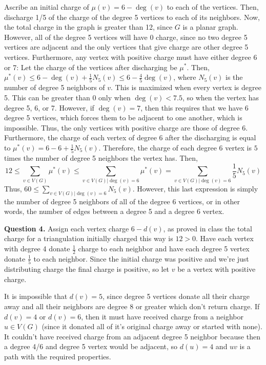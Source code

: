 \documentclass[letterpaper, reqno,11pt]{article}
\begin{document}
Ascribe an initial charge of $\mu(v) = 6 - \deg(v)$ to each of the vertices. Then, discharge 1/5 of the charge of the degree 5 vertices to each of its neighbors. Now, the total charge in the graph is greater than 12, since $G$ is a planar graph. However, all of the degree 5 vertices will have 0 charge, since no two degree 5 vertices are adjacent and the only vertices that give charge are other degree 5 vertices. Furthermore, any vertex with positive charge must have either degree 6 or 7: Let the charge of the vertices after discharging be $\mu^{*}$. Then, $\mu^{*}(v) \leq  6 - \deg(v) + \frac{1}{5}N_5(v) \leq 6 - \frac{4}{5}\deg(v)$, where $N_5(v)$ is the number of degree 5 neighbors of $v$. 
This is maximized when every vertex is degree 5. This can be greater than 0 only when $\deg(v) < 7.5$, so when the vertex has degree 5, 6, or 7. However, if $\deg(v) = 7$, then this requires that we have 6 degree 5 vertices, which forces them to be adjacent to one another, which is impossible. Thus, the only vertices with positive charge are those of degree 6. Furthermore, the charge of each vertex of degree 6 after the discharging is equal to $\mu^{*}(v) = 6 - 6 + \frac{1}{5}N_5(v)$. Therefore, the charge of each degree 6 vertex is $5$ times the number of degree 5 neighbors the vertex has. Then, \[12 \leq \sum_{v\in V(G)} \mu^*(v) \leq \sum_{v \in V(G)|\deg(v) = 6} \mu^* (v) = \sum_{v \in V(G) | \deg(v) = 6} \frac{1}{5}N_5(v) \]
Thus, $60 \leq \sum_{v \in V(G) | \deg(v) = 6} N_5(v)$. However, this last expression is simply the number of degree 5 neighbors of all of the degree 6 vertices, or in other words, the number of edges between a degree 5 and a degree 6 vertex.

{\medskip\noindent\bf Question 4.} Assign each vertex charge $6-d(v)$, as proved in class the total charge for a triangulation initially charged this way is $12>0$. Have each vertex with degree 4 donate $\frac{1}{2}$ charge to each neighbor and have each degree 5 vertex donate $\frac{1}{5}$ to each neighbor. Since the initial charge was positive and we're just distributing charge the final charge is positive, so let $v$ be a vertex with positive charge. 

It is impossible that $d(v)=5$, since degree 5 vertices donate all their charge away and all their neighbors are degree 8 or greater which don't return charge. If $d(v)=4$ or $d(v)=6$, then it must have received charge from a neighbor $u\in V(G)$ (since it donated all of it's original charge away or started with none). It couldn't have received charge from an adjacent degree 5 neighbor because then a degree 4/6 and degree 5 vertex would be adjacent, so $d(u)=4$ and $uv$ is a path with the required properties.
\end{document}
